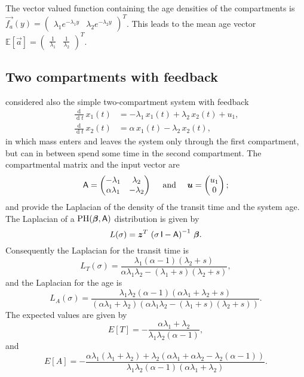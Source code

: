 \documentclass[smallextended]{svjour3}
\newcommand{\E}{\mathbb{E}}
\newcommand{\deriv}[1]{\frac{\operatorname{d}}{\operatorname{d}#1}}
\begin{document}
The vector valued function containing the age densities of the compartments is $\vec{f_a}(y) = \left(\begin{matrix}\lambda_{1} e^{- \lambda_{1} y} & \lambda_{2} e^{- \lambda_{2} y}\end{matrix}\right)^T$.
This leads to the  mean age vector $\E[\vec{a}] = \left(\begin{matrix}\frac{1}{\lambda_{1}} & \frac{1}{\lambda_{2}}\end{matrix}\right)^T$.


\subsection{Two compartments with feedback}


\citet{Manzoni2009JGR} considered also the simple two-compartment system with feedback
\begin{align*}
    \deriv{t}x_1(t) &= -\lambda_1\,x_1(t)+ \lambda_2\,x_2(t) + u_1,\\
    \deriv{t}x_2(t) &= \alpha\,x_1(t) - \lambda_2\,x_2(t),
\end{align*}
in which mass enters and leaves the system only through the first compartment, but can in between spend some time in the second compartment.
The compartmental matrix and the input vector are
\[
    \tens{A}=\left(\begin{matrix}- \lambda_{1} & \lambda_{2}\\\alpha \lambda_{1} & - \lambda_{2}\end{matrix}\right)\quad\text{ and }\quad \vec{u}=\left(\begin{matrix}u_{1}\\0\end{matrix}\right);
\]
and \citet{Manzoni2009JGR} provide the Laplacian of the density of the transit time and the system age.
The Laplacian of a $\operatorname{PH}(\vec{\beta},\tens{A})$ distribution is given by
\[
    L(\sigma) = \vec{z}^T\,\left(\sigma\,\tens{I}-\tens{A}\right)^{-1}\,\vec{\beta}.
\]
Consequently the Laplacian for the transit time is
\[
    L_T(\sigma) = \frac{\lambda_{1} \left(\alpha - 1\right) \left(\lambda_{2} + s\right)}{\alpha \lambda_{1} \lambda_{2} - \left(\lambda_{1} + s\right) \left(\lambda_{2} + s\right)},
\]
and the Laplacian for the age is
\[
    L_A(\sigma) = \frac{\lambda_{1} \lambda_{2} \left(\alpha - 1\right) \left(\alpha \lambda_{1} + \lambda_{2} + s\right)}{\left(\alpha \lambda_{1} + \lambda_{2}\right) \left(\alpha \lambda_{1} \lambda_{2} - \left(\lambda_{1} + s\right) \left(\lambda_{2} + s\right)\right)}.
\]
The expected values are given by
\[
    E[T] = - \frac{\alpha \lambda_{1} + \lambda_{2}}{\lambda_{1} \lambda_{2} \left(\alpha - 1\right)},
\]
and
\[
    E[A] = - \frac{\alpha \lambda_{1} \left(\lambda_{1} + \lambda_{2}\right) + \lambda_{2} \left(\alpha \lambda_{1} + \alpha \lambda_{2} - \lambda_{2} \left(\alpha - 1\right)\right)}{\lambda_{1} \lambda_{2} \left(\alpha - 1\right) \left(\alpha \lambda_{1} + \lambda_{2}\right)}.
\]
\end{document}
